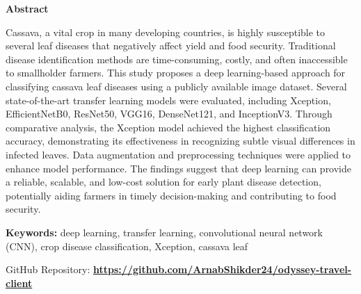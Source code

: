 \thispagestyle{plain}
\begin{center}
    \LARGE{\textbf{Abstract}}
\end{center}

Cassava, a vital crop in many developing countries, is highly susceptible to several leaf diseases that negatively affect yield and food security. Traditional disease identification methods are time-consuming, costly, and often inaccessible to smallholder farmers. This study proposes a deep learning-based approach for classifying cassava leaf diseases using a publicly available image dataset. Several state-of-the-art transfer learning models were evaluated, including Xception, EfficientNetB0, ResNet50, VGG16, DenseNet121, and InceptionV3. Through comparative analysis, the Xception model achieved the highest classification accuracy, demonstrating its effectiveness in recognizing subtle visual differences in infected leaves. Data augmentation and preprocessing techniques were applied to enhance model performance. The findings suggest that deep learning can provide a reliable, scalable, and low-cost solution for early plant disease detection, potentially aiding farmers in timely decision-making and contributing to food security.

\textbf{Keywords:} deep learning, transfer learning, convolutional neural network (CNN), crop disease classification, Xception, cassava leaf

\vspace{0.5cm}

\noindent GitHub Repository:
\href{https://github.com/ArnabShikder24/odyssey-travel-client}{\textbf{https://github.com/ArnabShikder24/odyssey-travel-client}} 

